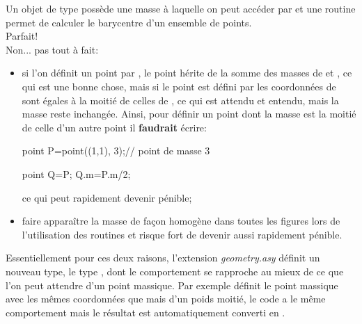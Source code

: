 \documentclass[pdftex]{article}
\newcommand{\geo}{l'extension \emph{geometry.asy}\xspace}
\begin{document}
Un objet de type  possède une masse à laquelle on peut
accéder par  et une routine permet de calculer le
barycentre d'un ensemble de points.\\
\og{}Parfait!\fg{}\\
Non... pas tout à fait:
\begin{itemize}
\item si l'on définit un point  par
  , le point
   hérite de la somme des masses de  et , ce qui est une
  bonne chose, mais si le point  est défini par  les
  coordonnées de  sont égales à la moitié de celles de , ce qui est
  attendu et entendu, mais la masse reste inchangée. Ainsi, pour
  définir un point dont la masse est la moitié de celle d'un autre point
  il \textbf{faudrait} écrire:
  \begin{Vcolor}
    point P=point((1,1), 3);// point de masse 3

    point Q=P;
    Q.m=P.m/2;
  \end{Vcolor}
  ce qui peut rapidement devenir pénible;
\item faire apparaître la masse de façon homogène dans toutes les
  figures lors de l'utilisation des routines  et
   risque fort de devenir aussi rapidement pénible.
\end{itemize}
Essentiellement pour ces deux raisons, \geo définit un nouveau type,
le type , dont le comportement se rapproche au mieux de ce
que l'on peut attendre d'un \og{}point massique\fg{}. Par exemple
 définit le point massique  avec les mêmes
coordonnées que  mais d'un poids moitié, le code
 a le même comportement mais le résultat
est automatiquement converti en .
\end{document}
